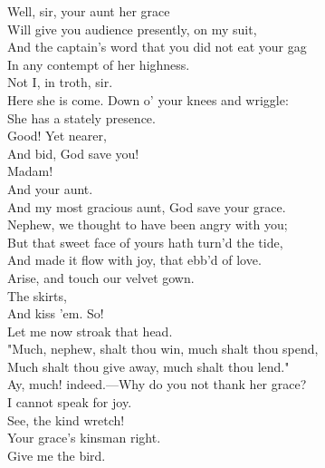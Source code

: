 \documentclass[a4paper,oneside]{memoir}
\begin{document}
\begin{drama*}
\subtlespeaks {} Well, sir, your aunt her grace\\
Will give you audience presently, on my suit,\\
And the captain's word that you did not eat your gag\\
In any contempt of her highness.\\
\dapperspeaks {} Not I, in troth, sir.\\
\subtlespeaks Here she is come. Down o' your knees and wriggle:\\
She has a stately presence.\\
 Good! Yet nearer,\\
And bid, God save you!\\
\dapperspeaks {} Madam!\\
\subtlespeaks {} And your aunt.\\
\dapperspeaks And my most gracious aunt, God save your grace.\\
\dolspeaks Nephew, we thought to have been angry with you;\\
But that sweet face of yours hath turn'd the tide,\\
And made it flow with joy, that ebb'd of love.\\
Arise, and touch our velvet gown.\\
\subtlespeaks {} The skirts,\\
And kiss 'em. So!\\
\dolspeaks {} Let me now stroak that head.\\
"Much, nephew, shalt thou win, much shalt thou spend,\\
Much shalt thou give away, much shalt thou lend."\\
\subtlespeaks {} Ay, much! indeed.---Why do you not thank her grace?\\
\dapperspeaks I cannot speak for joy.\\
\subtlespeaks {} See, the kind wretch!\\
Your grace's kinsman right.\\
\dolspeaks {} Give me the bird.\\

\end{drama*}
\end{document}
